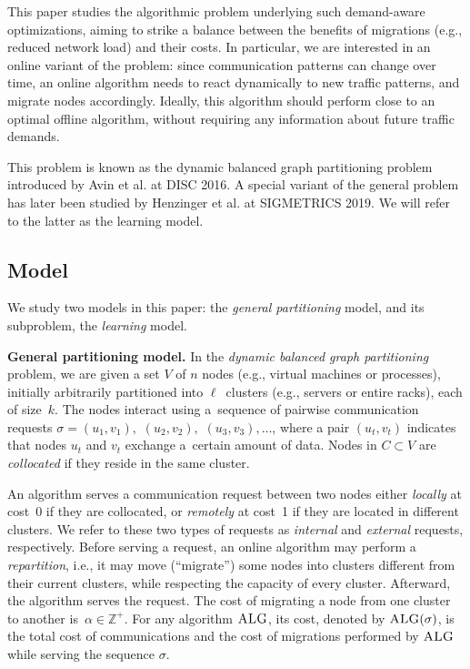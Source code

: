 \documentclass[a4paper,anonymous,USenglish]{lipics-v2019}
\newcommand{\ALG}{\textsc{ALG}\xspace}
\begin{document}
This paper studies the algorithmic problem underlying such demand-aware
optimizations, aiming to strike a balance between the benefits of migrations (e.g., reduced network load) and their costs.
In particular, we are interested in an online variant of the problem: since communication patterns can change over time, an online algorithm needs to react dynamically to new traffic patterns, and migrate nodes  accordingly.
Ideally, this algorithm should perform close to an optimal offline algorithm, without requiring any information about future traffic demands. 

This problem is known as the dynamic balanced graph partitioning problem introduced by Avin et al. \cite{repartition-disc, sidma-arxiv} at DISC 2016. A special variant of the general problem has later been studied by Henzinger et al. \cite{sigmetrics19_partitioning} at SIGMETRICS 2019.
We will refer to the latter as the learning model.



\subsection{Model}

We study two models in this paper: the \emph{general partitioning} model, and its subproblem, the \emph{learning} model.

\noindent
\textbf{General partitioning model.}
In the \emph{dynamic balanced graph partitioning} problem, we are given a set $V$ of $n$ nodes 
(e.g., virtual machines or processes),
initially arbitrarily partitioned into $\ell$~clusters
(e.g., servers or entire racks),
each of size~$k$.
The nodes interact using
a~sequence of pairwise communication requests
$\sigma = (u_1,v_1),$ $(u_2,v_2),$ $(u_3,v_3), \ldots$,
where a pair $(u_t,v_t)$ indicates that nodes $u_t$ and $v_t$ exchange a~certain amount of data.
Nodes in $C \subset V$ are \emph{collocated}
if they reside in the same cluster.

An algorithm serves a communication request between two nodes
either \emph{locally} at cost~0
if they are collocated,
or \emph{remotely} at cost~1
if they are located in different clusters.
We refer to these two types of requests as \emph{internal}
and \emph{external} requests, respectively.
Before serving a request,
an online algorithm may perform a \emph{repartition},
i.e.,
it may move (``migrate'') some nodes into clusters different from their current clusters, while respecting the capacity of every cluster. 
Afterward, 
the algorithm serves the  request.
The cost of migrating a node from one cluster to another
is~$\alpha \in \mathbb{Z}^+$.
For any algorithm $\ALG$,
its cost,
denoted by $\ALG(\sigma)$,
is the total cost of communications and
the cost of migrations performed by $\ALG$ while serving the sequence $\sigma$.
\end{document}
